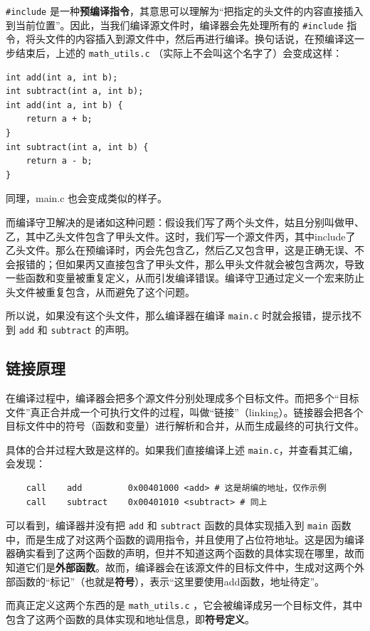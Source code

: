 \texttt{\#include} 是一种\textbf{预编译指令}，其意思可以理解为“把指定的头文件的内容直接插入到当前位置”。因此，当我们编译源文件时，编译器会先处理所有的 \texttt{\#include} 指令，将头文件的内容插入到源文件中，然后再进行编译。换句话说，在预编译这一步结束后，上述的 \texttt{math\_utils.c} （实际上不会叫这个名字了）会变成这样：
\begin{verbatim}
int add(int a, int b);
int subtract(int a, int b);
int add(int a, int b) {
    return a + b;
}
int subtract(int a, int b) {
    return a - b;
}
\end{verbatim}
同理，main.c 也会变成类似的样子。

而编译守卫解决的是诸如这种问题：假设我们写了两个头文件，姑且分别叫做甲、乙，其中乙头文件包含了甲头文件。这时，我们写一个源文件丙，其中include了乙头文件。那么在预编译时，丙会先包含乙，然后乙又包含甲，这是正确无误、不会报错的；但如果丙又直接包含了甲头文件，那么甲头文件就会被包含两次，导致一些函数和变量被重复定义，从而引发编译错误。编译守卫通过定义一个宏来防止头文件被重复包含，从而避免了这个问题。

所以说，如果没有这个头文件，那么编译器在编译 \texttt{main.c} 时就会报错，提示找不到 \texttt{add} 和 \texttt{subtract} 的声明。

\subsection{链接原理}

在编译过程中，编译器会把多个源文件分别处理成多个目标文件。而把多个“目标文件”真正合并成一个可执行文件的过程，叫做“链接”（linking）。链接器会把各个目标文件中的符号（函数和变量）进行解析和合并，从而生成最终的可执行文件。

具体的合并过程大致是这样的。如果我们直接编译上述 \texttt{main.c}，并查看其汇编，会发现：
\begin{verbatim}
    call    add         0x00401000 <add> # 这是胡编的地址，仅作示例
    call    subtract    0x00401010 <subtract> # 同上
\end{verbatim}
可以看到，编译器并没有把 \texttt{add} 和 \texttt{subtract} 函数的具体实现插入到 \texttt{main} 函数中，而是生成了对这两个函数的调用指令，并且使用了占位符地址。这是因为编译器确实看到了这两个函数的声明，但并不知道这两个函数的具体实现在哪里，故而知道它们是\textbf{外部函数}。故而，编译器会在该源文件的目标文件中，生成对这两个外部函数的“标记”（也就是\textbf{符号}），表示“这里要使用add函数，地址待定”。

而真正定义这两个东西的是 \texttt{math\_utils.c} ，它会被编译成另一个目标文件，其中包含了这两个函数的具体实现和地址信息，即\textbf{符号定义}。

